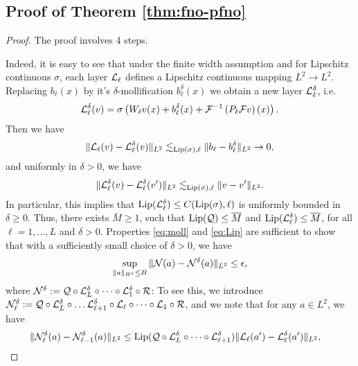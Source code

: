 \documentclass[reqno,a4paper]{amsart}
\begin{document}
\subsection{Proof of Theorem \ref{thm:fno-pfno}}
\label{app:fno-pfno}
\begin{proof}
The proof involves 4 steps. 


\noindent 
Indeed, it is easy to see that under the finite width assumption and for Lipschitz continuous $\sigma$, each layer $\mathcal{L}_\ell$ defines a Lipschitz continuous mapping $L^2 \to L^2$. Replacing $b_\ell(x)$ by it's $\delta$-mollification $b^\delta_\ell(x)$ we obtain a new layer $\mathcal{L}^\delta_\ell$, i.e.
\[
\mathcal{L}^\delta_\ell(v) 
=
\sigma\left(
W_\ell v(x) + b^\delta_\ell(x) + \mathcal{F}^{-1}\left( P_\ell \mathcal{F} v\right)(x)
\right).
\]
Then we have 
\begin{align} \label{eq:moll}
\Vert \mathcal{L}_\ell(v) - \mathcal{L}^\delta_\ell(v) \Vert_{L^2}
\lesssim_{\mathrm{Lip}(\sigma),\ell}
\Vert b_\ell - b^\delta_\ell \Vert_{L^2}
\to 0,
\end{align}
and uniformly in $\delta > 0$, we have
\begin{align} \label{eq:Lip}
\Vert
\mathcal{L}_\ell^\delta(v) - \mathcal{L}_\ell^\delta(v')
\Vert_{L^2}
\lesssim_{\mathrm{Lip}(\sigma),\ell} 
\Vert v - v' \Vert_{L^2}.
\end{align}
In particular, this implies that $\mathrm{Lip}(\mathcal{L}_\ell^\delta) \le C(\mathrm{Lip}(\sigma),\ell)$ is uniformly bounded in $\delta \ge 0$. Thus, there exists $\bar{M} \ge 1$, such that $\mathrm{Lip}(\mathcal{Q}) \le \overline{M}$ and $\mathrm{Lip}(\mathcal{L}_\ell^\delta)\le \overline{M}$, for all $\ell=1,\dots, L$ and $\delta > 0$. Properties \eqref{eq:moll} and \eqref{eq:Lip} are sufficient to show that with a sufficiently small choice of $\delta > 0$, we have
\begin{align} \label{eq:Ndeps}
\sup_{\Vert a \Vert_{H^s} \le B} \Vert \mathcal{N}(a) - \mathcal{N}^\delta(a) \Vert_{L^2} \le \epsilon,
\end{align}
where $\mathcal{N}^\delta := \mathcal{Q}\circ \mathcal{L}^\delta_L \circ \dots \circ \mathcal{L}^\delta_1 \circ\mathcal{R}$: To see this, we introduce $\mathcal{N}^\delta_{\ell} := \mathcal{Q} \circ \mathcal{L}^\delta_L \circ\dots \mathcal{L}^\delta_{\ell+1} \circ \mathcal{L}_\ell \circ \dots \circ \mathcal{L}_1 \circ \mathcal{R}$, and we note that for any $a\in L^2$, we have
\begin{align*}
\Vert
\mathcal{N}^\delta_\ell(a) - \mathcal{N}^\delta_{\ell-1}(a)
\Vert_{L^2}
&\le
\mathrm{Lip}(\mathcal{Q} \circ \mathcal{L}^\delta_{L}\circ \dots \circ \mathcal{L}^\delta_{\ell+1})
\Vert 
\mathcal{L}_\ell(a')
 - 
\mathcal{L}^\delta_{\ell}(a') 
\Vert_{L^2},
\end{align*}

\end{proof}
\end{document}
